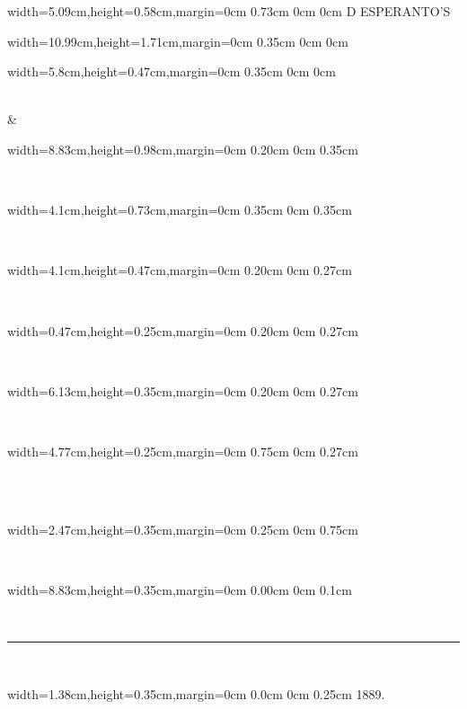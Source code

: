 \begin{titlepage}
\vspace*{\fill}

\begin{center}

\begin{adjustbox}{width=5.09cm,height=0.58cm,margin=0cm 0.73cm 0cm 0cm}
\latin\huge D ESPERANTO’S
\end{adjustbox}
\begin{adjustbox}{width=10.99cm,height=1.71cm,margin=0cm 0.35cm 0cm 0cm}
\end{adjustbox}
\begin{adjustbox}{width=5.8cm,height=0.47cm,margin=0cm 0.35cm 0cm 0cm}
{}
\end{adjustbox}\\
\&\\
\begin{adjustbox}{width=8.83cm,height=0.98cm,margin=0cm 0.20cm 0cm 0.35cm}
\shadowoffset{0.5pt}
\end{adjustbox}\\
\begin{adjustbox}{width=4.1cm,height=0.73cm,margin=0cm 0.35cm 0cm 0.35cm}
\poranglojbox
\end{adjustbox}\\
\begin{adjustbox}{width=4.1cm,height=0.47cm,margin=0cm 0.20cm 0cm 0.27cm}
\end{adjustbox}\\
\begin{adjustbox}{width=0.47cm,height=0.25cm,margin=0cm 0.20cm 0cm 0.27cm}
\end{adjustbox}\\
\begin{adjustbox}{width=6.13cm,height=0.35cm,margin=0cm 0.20cm 0cm 0.27cm}
\end{adjustbox}\\
\begin{adjustbox}{width=4.77cm,height=0.25cm,margin=0cm 0.75cm 0cm 0.27cm}
\end{adjustbox}\\
\\
\begin{adjustbox}{width=2.47cm,height=0.35cm,margin=0cm 0.25cm 0cm 0.75cm}
\end{adjustbox}\\
\begin{adjustbox}{width=8.83cm,height=0.35cm,margin=0cm 0.00cm 0cm 0.1cm}
\end{adjustbox}\\[-0.15cm]
\rule{3em}{0.4pt}\\
\begin{adjustbox}{width=1.38cm,height=0.35cm,margin=0cm 0.0cm 0cm 0.25cm}
1889.
\end{adjustbox}


\end{center}
\end{titlepage}
